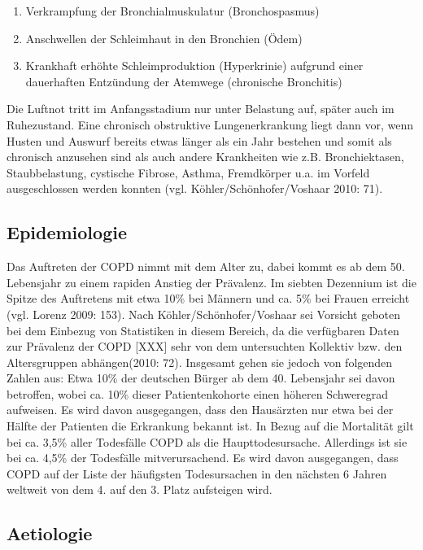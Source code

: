 \begin{enumerate}
\item Verkrampfung der Bronchialmuskulatur (Bronchospasmus)
\item Anschwellen der Schleimhaut in den Bronchien (Ödem)
\item Krankhaft erhöhte Schleimproduktion (Hyperkrinie) aufgrund einer dauerhaften Entzündung der Atemwege (chronische Bronchitis)
\end{enumerate}

Die Luftnot tritt im Anfangsstadium nur unter Belastung auf, später auch im Ruhezustand.
Eine chronisch obstruktive Lungenerkrankung liegt dann vor, wenn Husten und Auswurf bereits etwas länger als ein Jahr bestehen und somit als chronisch anzusehen sind als auch andere Krankheiten wie z.B. Bronchiektasen, Staubbelastung, cystische Fibrose, Asthma, Fremdkörper u.a. im Vorfeld ausgeschlossen werden konnten (vgl. Köhler/Schönhofer/Voshaar 2010: 71).

\subsection{Epidemiologie}
\label{epidemiologie}
Das Auftreten der COPD nimmt mit dem Alter zu, dabei kommt es ab dem 50. Lebensjahr zu einem rapiden Anstieg der Prävalenz. Im siebten Dezennium ist die Spitze des Auftretens mit etwa 10\% bei Männern und ca. 5\% bei Frauen erreicht (vgl. Lorenz 2009: 153). Nach Köhler/Schönhofer/Voshaar sei Vorsicht geboten bei dem Einbezug von Statistiken in diesem Bereich, da die verfügbaren Daten zur Prävalenz der COPD [XXX] sehr von dem untersuchten Kollektiv bzw. den Altersgruppen abhängen(2010: 72). Insgesamt gehen sie jedoch von folgenden Zahlen aus: Etwa 10\% der deutschen Bürger ab dem 40. Lebensjahr sei davon betroffen, wobei ca. 10\% dieser Patientenkohorte einen höheren Schweregrad aufweisen. Es wird davon ausgegangen, dass den Hausärzten nur etwa bei der Hälfte der Patienten die Erkrankung bekannt ist.
In Bezug auf die Mortalität gilt bei ca. 3,5\% aller Todesfälle COPD als die Haupttodesursache. Allerdings ist sie bei ca. 4,5\% der Todesfälle mitverursachend. Es wird davon ausgegangen, dass COPD auf der Liste der häufigsten Todesursachen in den nächsten 6 Jahren weltweit von dem 4. auf den 3. Platz aufsteigen wird.

\subsection{Aetiologie}
\label{aetiologie}

